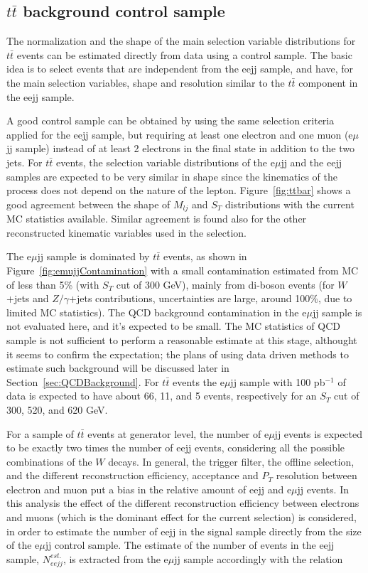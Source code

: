 \subsection{$t\bar{t}$ background control sample}

The normalization and the shape of the main selection variable distributions for 
$t\bar{t}$ events can be estimated directly from data using a control sample. 
The basic idea is to select events that are independent from the eejj sample, and have, for the main selection variables, 
shape and resolution similar to the $t\bar{t}$ component in the eejj sample.

A good control sample can be obtained by using the same selection criteria applied for the eejj sample, but 
requiring at least one electron and one muon (e$\mu$jj sample) instead of at least 2 electrons 
in the final state in addition to the two jets. 
For $t\bar{t}$ events, the selection variable distributions of the e$\mu$jj and the eejj samples
are expected to be very similar in shape since the kinematics of the process does not depend 
on the nature of the lepton. Figure~\ref{fig:ttbar} shows a good agreement between 
the shape of $M_{lj}$ and $S_{T}$ distributions with the current MC statistics available. Similar agreement 
is found also for the other reconstructed kinematic variables used in the selection. 

The e$\mu$jj sample is dominated by $t\bar{t}$ events, as shown in Figure~\ref{fig:emujjContamination} 
with a small contamination estimated from MC of less than 5\% (with $S_{T}$ cut of 300 GeV), 
mainly from di-boson events (for $W$+jets and $Z/\gamma$+jets contributions, uncertainties are large, 
around 100\%, due to limited MC statistics). 
The QCD background contamination in the e$\mu$jj sample is not evaluated here, and it's expected to be small. 
The MC statistics of QCD sample is not sufficient to perform a reasonable estimate at this stage, althought 
it seems to confirm the expectation; the plans of using data driven methods to estimate such background 
will be discussed later in Section~\ref{sec:QCDBackground}. 
For $t\bar{t}$ events the e$\mu$jj sample with 100 pb$^{-1}$ of data 
is expected to have about 66, 11, and 5 events, respectively for an $S_{T}$ cut of 300, 520, and 620 GeV.

For a sample of $t\bar{t}$ events at generator level, the number of e$\mu$jj events is expected to be exactly two times the number of 
eejj events, considering all the possible combinations of the $W$ decays. In general, the trigger filter, the offline selection, 
and the different reconstruction efficiency, acceptance and $P_{T}$ resolution between electron and muon
put a bias in the relative amount of eejj and e$\mu$jj events. 
In this analysis the effect of the different reconstruction efficiency between electrons and muons 
(which is the dominant effect for the current selection) 
is considered, in order to estimate the number of eejj in the signal sample directly from 
the size of the e$\mu$jj control sample. The estimate of the number of events in the eejj sample, 
$N_{eejj}^{est.}$, is extracted from the e$\mu$jj sample accordingly with the relation 

